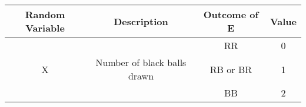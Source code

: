 \begin{tabular}{|c|c|c|c|}
\hline
\textbf{Random Variable}&\textbf{Description}&\textbf{Outcome of E}&\textbf{Value}\\
\hline
	&	&RR	&0\\\cline{3-4}
X	&Number of black balls drawn	&RB or BR	&1\\\cline{3-4}
	&	&BB	&2\\\hline
\end{tabular}
